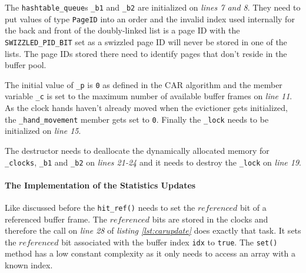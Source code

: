     The \lstinline{hashtable_queue}s \lstinline{_b1} and \lstinline{_b2} are initialized on \emph{lines 7 and 8}. They need to put values of type \lstinline{PageID} into an order and the invalid index used internally for the back and front of the doubly-linked list is a page ID with the \lstinline{SWIZZLED_PID_BIT} set as a swizzled page ID will never be stored in one of the lists. The page IDs stored there need to identify pages that don't reside in the buffer pool.

    The initial value of \lstinline{_p} is \lstinline{0} as defined in the CAR algorithm and the member variable \lstinline{_c} is set to the maximum number of available buffer frames on \emph{line 11}. As the clock hands haven't already moved when the evictioner gets initialized, the \lstinline{_hand_movement} member gets set to \lstinline{0}. Finally the \lstinline{_lock} needs to be initialized on \emph{line 15}.

    The destructor needs to deallocate the dynamically allocated memory for \lstinline{_clocks}, \lstinline{_b1} and \lstinline{_b2} on \emph{lines 21-24} and it needs to destroy the \lstinline{_lock} on \emph{line 19}.

\paragraph{The Implementation of the Statistics Updates}

\begin{@empty}
    \lstset{
        language = [ISO]C++,
        style = basic
    }
    \begin{code}[ht!]
        \caption{Implementation of \lstinline{page_evictioner_car::hit_ref()}, \lstinline{miss_ref()}, \lstinline{used_ref()} and \lstinline{unbuffered()}} \label{lst:carupdate}
        
    \end{code}
\end{@empty}

    Like discussed before the \lstinline{hit_ref()} needs to set the $referenced$ bit of a referenced buffer frame. The $referenced$ bits are stored in the clocks and therefore the call on \emph{line 28} of \emph{listing \ref{lst:carupdate}} does exactly that task. It sets the $referenced$ bit associated with the buffer index \lstinline{idx} to \lstinline{true}. The \lstinline{set()} method has a low constant complexity as it only needs to access an array with a known index.

